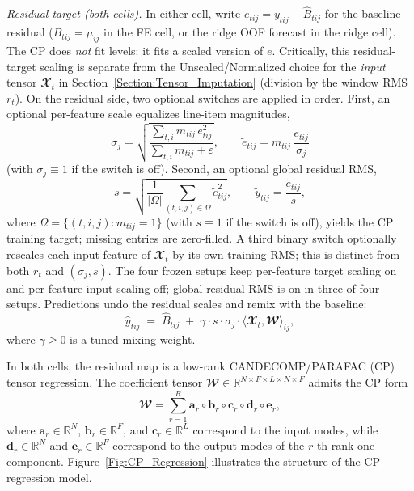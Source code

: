 \documentclass[pdflatex,sn-mathphys-num]{sn-jnl}%
\theoremstyle{thmstyleone}%
\theoremstyle{thmstyletwo}%
\theoremstyle{thmstylethree}%
\begin{document}
\textit{Residual target (both cells).} In either cell, write $e_{tij} = y_{tij} - \widehat{B}_{tij}$ for the baseline residual ($\widehat{B}_{tij}=\mu_{ij}$ in the FE cell, or the ridge OOF forecast in the ridge cell). The CP does \emph{not} fit levels: it fits a scaled version of $e$. Critically, this residual-target scaling is separate from the Unscaled/Normalized choice for the \emph{input} tensor $\mathbfcal{X}_t$ in Section~\ref{Section:Tensor_Imputation} (division by the window RMS $r_t$). On the residual side, two optional switches are applied in order. First, an optional per-feature scale equalizes line-item magnitudes,
\begin{equation}
\sigma_j = \sqrt{\frac{\sum_{t,i} m_{tij}\, e_{tij}^2}{\sum_{t,i} m_{tij}+\varepsilon}},
\qquad
\tilde{e}_{tij} = m_{tij}\,\frac{e_{tij}}{\sigma_j}
\end{equation}
(with $\sigma_j\equiv 1$ if the switch is off). Second, an optional global residual RMS,
\begin{equation}
s = \sqrt{\frac{1}{|\Omega|}\sum_{(t,i,j)\in\Omega}\tilde{e}_{tij}^2},
\qquad
\tilde{y}_{tij} = \frac{\tilde{e}_{tij}}{s},
\end{equation}
where $\Omega=\{(t,i,j):m_{tij}=1\}$ (with $s\equiv 1$ if the switch is off), yields the CP training target; missing entries are zero-filled. A third binary switch optionally rescales each input feature of $\mathbfcal{X}_t$ by its own training RMS; this is distinct from both $r_t$ and $(\sigma_j,s)$. The four frozen setups keep per-feature target scaling on and per-feature input scaling off; global residual RMS is on in three of four setups. Predictions undo the residual scales and remix with the baseline:
\begin{equation}
\label{Eq:Ensemble}
\widehat{y}_{tij} \;=\; \widehat{B}_{tij} \;+\; \gamma \cdot s \cdot \sigma_j \cdot \langle \mathbfcal{X}_t, \mathbfcal{W} \rangle_{ij},
\end{equation}
where $\gamma\geq 0$ is a tuned mixing weight.

In both cells, the residual map is a low-rank CANDECOMP/PARAFAC (CP) tensor regression. The coefficient tensor $\mathbfcal{W} \in \mathbb{R}^{N \times F \times L \times N \times F}$ admits the CP form
\begin{equation}
\mathbfcal{W} = \sum_{r=1}^{R} \mathbf{a}_r \circ \mathbf{b}_r \circ \mathbf{c}_r \circ \mathbf{d}_r \circ \mathbf{e}_r,
\end{equation}
where $\mathbf{a}_r \in \mathbb{R}^N$, $\mathbf{b}_r \in \mathbb{R}^F$, and $\mathbf{c}_r \in \mathbb{R}^L$ correspond to the input modes, while $\mathbf{d}_r \in \mathbb{R}^N$ and $\mathbf{e}_r \in \mathbb{R}^F$ correspond to the output modes of the $r$-th rank-one component. Figure~\ref{Fig:CP_Regression} illustrates the structure of the CP regression model.
\end{document}
